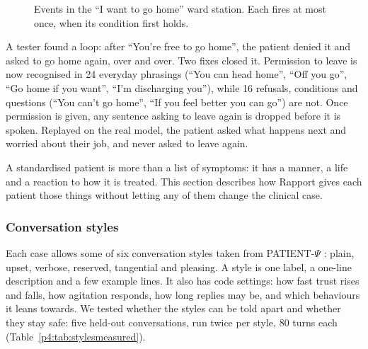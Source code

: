 \documentclass[10pt]{article}
\begin{document}
\begin{figure}[htbp]
\centering
{}
\caption{Events in the ``I want to go home'' ward station. Each fires at most once, when its condition first holds.}
\label{p2:fig:events}
\end{figure}

A tester found a loop: after ``You're free to go home'', the patient denied it and asked to go home again, over and over. Two fixes closed it.
Permission to leave is now recognised in 24 everyday phrasings (``You can head home'', ``Off you go'', ``Go home if you want'', ``I'm discharging
you''), while 16 refusals, conditions and questions (``You can't go home'', ``If you feel better you can go'') are not. Once permission is given,
any sentence asking to leave again is dropped before it is spoken. Replayed on the real model, the patient asked what happens next and worried
about their job, and never asked to leave again.




A standardised patient is more than a list of symptoms: it has a manner, a life and a reaction to how it is treated. This section describes
how Rapport gives each patient those things without letting any of them change the clinical case.

\subsubsection{Conversation styles}
Each case allows some of six conversation styles taken from PATIENT-$\Psi$ \cite{wang2024patient}: plain, upset, verbose, reserved, tangential
and pleasing. A style is one label, a one-line description and a few example lines. It also has code settings: how fast trust rises and falls, how agitation responds, how long replies may be, and which behaviours it leans towards. We tested whether the styles can be told apart and whether
they stay safe: five held-out conversations, run twice per style, 80 turns each (Table~\ref{p4:tab:stylesmeasured}).
\end{document}
